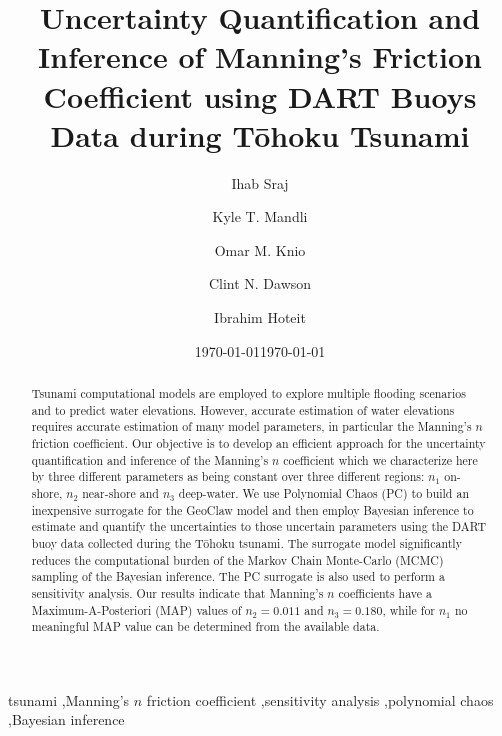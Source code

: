 \documentclass[review,12pt]{elsarticle}
\newcommand{\geoclaw}{{\sc GeoClaw}\xspace}
\newcommand{\tohoku}{T\={o}hoku\xspace}
\begin{document}
\ifpdf
{}
\else
{}
\fi

\begin{frontmatter}

\title{Uncertainty Quantification and Inference of Manning's Friction Coefficient using DART Buoys Data during
\tohoku Tsunami}
\date{\today}

\author[kaust1]{Ihab Sraj}
\author[ut]{Kyle T. Mandli}
\author[duke,kaust2]{Omar M. Knio}
\author[ut]{Clint N. Dawson}
\author[kaust1,kaust2]{Ibrahim Hoteit}
\address[kaust1]{Division of Physical Sciences and Engineering, King Abdullah University for Science and Technology, Thuwal, Saudi Arabia}

\address[ut]{Institute for Computational Engineering and Science, University of Texas at Austin, 201 E 24th ST. Stop C0200, Austin, TX 78712-1229, USA}
\address[duke]{Department of Mechanical Engineering and Materials Science, Duke University, 144
Hudson Hall, Durham, North Carolina 27708, USA}
\address[kaust2]{Division of Computer, Electrical and Mathematical Sciences and Engineering, King Abdullah University for Science and Technology, Thuwal, Saudi Arabia}
\date{\today}

\begin{abstract}

Tsunami computational models are employed to explore multiple flooding
scenarios and to predict water elevations.  However, accurate estimation of
water elevations  requires accurate estimation of many model parameters, in
particular the Manning's $n$ friction coefficient.  Our objective is to
develop an efficient approach for the  uncertainty quantification and inference
of the Manning's $n$ coefficient which we characterize here by three different
parameters as being constant over three different regions: $n_1$ on-shore,
$n_2$ near-shore and $n_3$ deep-water.  We use Polynomial Chaos (PC) to build an
inexpensive surrogate for the  \geoclaw model and then employ Bayesian inference
to estimate  and quantify the uncertainties to those uncertain parameters using
the DART buoy data collected during the \tohoku tsunami.  The surrogate model
significantly reduces the computational burden of the Markov Chain Monte-Carlo
(MCMC)  sampling of the Bayesian inference. The PC surrogate is also used to
perform a sensitivity analysis.  Our results indicate that Manning's $n$
coefficients have a Maximum-A-Posteriori (MAP) values of $n_2=0.011$ and
$n_3=0.180$, while for $n_1$ no meaningful MAP value can be determined from the
available data.

\end{abstract}

\begin{keyword}
tsunami \sep Manning's $n$ friction coefficient \sep sensitivity analysis \sep polynomial chaos \sep Bayesian inference
\end{keyword}

\end{frontmatter}
\linenumbers
\end{document}
